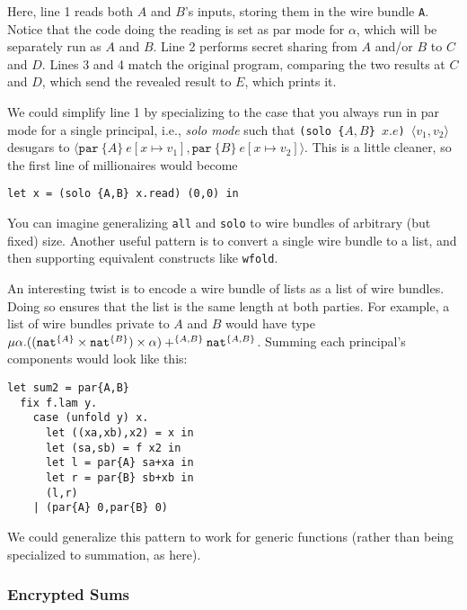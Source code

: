 \documentclass[10pt]{article}
\newcommand{\kw}[1]{\ensuremath{\mathtt{#1}}}
\newcommand{\tnat}{\ensuremath{\mathtt{nat}}}
\newcommand{\tpair}[2]{\ensuremath{{#1} \times {#2}}}
\newcommand{\tsum}[3]{\ensuremath{{#1} +^{#3} {#2}}}
\newcommand{\trec}[2]{\ensuremath{\mu {#1}.{#2}}}
\newcommand{\epar}[2]{\ensuremath{\kw{par}~{#1}~{#2}}}
\newcommand{\epair}[2]{\ensuremath{\langle {#1}, {#2} \rangle}}
\begin{document}
\bigskip
Here, line 1 reads both $A$ and $B$'s inputs, storing them in the wire
bundle \texttt{A}. Notice that the code doing the reading is set as
par mode for $\alpha$, which will be separately run as $A$ and
$B$. Line 2 performs secret sharing from $A$ and/or $B$ to $C$ and
$D$. Lines 3 and 4 match the original program, comparing the two
results at $C$ and $D$, which send the revealed result to $E$, which
prints it.

We could simplify line 1 by specializing to the case that you always
run in par mode for a single principal, i.e., \emph{solo mode} such
that 
\verb+(solo {+$A,B$\verb+} +$x.e$\verb+) +$\epair{v_1}{v_2}$
desugars to
$
\epair{\epar{\{A\}}{e}[x \mapsto v_1]}{\epar{\{B\}}{e[x \mapsto v_2]}}
$.
This is a little cleaner, so the first line of millionaires would become
\begin{verbatim}
let x = (solo {A,B} x.read) (0,0) in
\end{verbatim}
You can imagine generalizing \texttt{all} and \texttt{solo} to wire
bundles of arbitrary (but fixed) size. Another useful pattern is to convert a single wire bundle to a list,
and then supporting equivalent constructs like \texttt{wfold}.

An interesting twist is to encode a wire bundle of lists as a list of
wire bundles. Doing so ensures that the list is the same length at
both parties. For example, a list of wire
bundles private to $A$ and $B$ would have type 
$\trec{\alpha}{\tsum{(\tpair{(\tpair{\tnat^{\{A\}}}{\tnat^{\{B\}}})}{\alpha})}{\tnat^{\twoprins}}{\twoprins}}$.
Summing each principal's components would look like this:
\begin{verbatim}
let sum2 = par{A,B}
  fix f.lam y.
    case (unfold y) x.
      let ((xa,xb),x2) = x in
      let (sa,sb) = f x2 in
      let l = par{A} sa+xa in
      let r = par{B} sb+xb in
      (l,r)
    | (par{A} 0,par{B} 0)
\end{verbatim}
We could generalize this pattern to work for generic functions (rather
than being specialized to summation, as here).


\subsubsection{Encrypted Sums}
\end{document}

